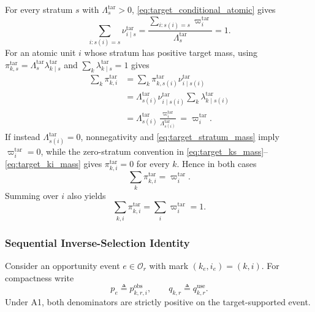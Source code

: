 \documentclass[letterpaper,journal]{IEEEtran}
\begin{document}
For every stratum $s$ with $\Lambda_s^{\mathrm{tar}}>0$,
\eqref{eq:target_conditional_atomic} gives
\begin{equation}
    \sum_{i:s(i)=s}
    \nu^{\mathrm{tar}}_{i\mid s}
    =
    \frac{
    \sum_{i:s(i)=s}\varpi_i^{\mathrm{tar}}
    }{
    \Lambda_s^{\mathrm{tar}}
    }
    =1.
    \label{eq:app_nu_normalization}
\end{equation}
For an atomic unit $i$ whose stratum has positive target mass, using
$\pi^{\mathrm{tar}}_{k,s}
=\Lambda_s^{\mathrm{tar}}
\lambda^{\mathrm{tar}}_{k\mid s}$ and
$\sum_k\lambda^{\mathrm{tar}}_{k\mid s}=1$ gives
\begin{align}
 \sum_k\pi^{\mathrm{tar}}_{k,i}
 &=
 \sum_k
 \pi^{\mathrm{tar}}_{k,s(i)}
 \nu^{\mathrm{tar}}_{i\mid s(i)}
 \nonumber\\
 &=
 \Lambda_{s(i)}^{\mathrm{tar}}
 \nu^{\mathrm{tar}}_{i\mid s(i)}
 \sum_k
 \lambda^{\mathrm{tar}}_{k\mid s(i)}
 \nonumber\\
 &=
 \Lambda_{s(i)}^{\mathrm{tar}}
 \frac{\varpi_i^{\mathrm{tar}}}
 {\Lambda_{s(i)}^{\mathrm{tar}}}
 =
 \varpi_i^{\mathrm{tar}}.
 \label{eq:app_target_compatibility_positive}
\end{align}
If instead $\Lambda_{s(i)}^{\mathrm{tar}}=0$, nonnegativity and
\eqref{eq:target_stratum_mass} imply $\varpi_i^{\mathrm{tar}}=0$, while the
zero-stratum convention in \eqref{eq:target_ks_mass}--\eqref{eq:target_ki_mass}
gives $\pi^{\mathrm{tar}}_{k,i}=0$ for every $k$.  Hence in both cases
\begin{equation}
 \sum_k\pi^{\mathrm{tar}}_{k,i}
 =\varpi_i^{\mathrm{tar}}.
 \label{eq:app_target_compatibility}
\end{equation}
Summing over $i$ also yields
\begin{equation}
    \sum_{k,i}\pi^{\mathrm{tar}}_{k,i}
    =
    \sum_i\varpi_i^{\mathrm{tar}}
    =1.
    \label{eq:app_pi_normalized}
\end{equation}

\subsubsection{Sequential Inverse-Selection Identity}

Consider an opportunity event $e\in\mathcal{O}_r$ with mark
$(k_e,i_e)=(k,i)$.  For compactness write
\begin{equation}
    p_e
    \triangleq
    p^{\mathrm{obs}}_{k,r,i},
    \qquad
    q_{k,r}
    \triangleq
    q^{\mathrm{use}}_{k,r}.
    \label{eq:app_pq_short}
\end{equation}
Under A1, both denominators are strictly positive on the target-supported event.
\end{document}
